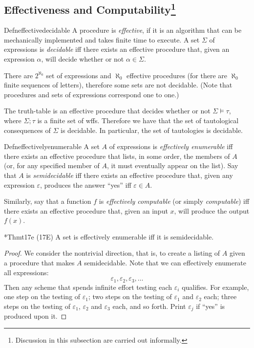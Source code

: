 \subsection*{Effectiveness and Computability\footnote{Discussion in this subsection are carried out informally.}}

\begin{reference}{Defn}{effectivedecidable}
  A procedure is \textit{effective}, if it is an algorithm that can be mechanically implemented and takes finite time to execute. A set $\Sigma$ of expressions is \textit{decidable} iff there exists an effective procedure that, given an expression $\alpha$, will decide whether or not $\alpha\in \Sigma$.
\end{reference}

There are $2^{\aleph_0}$ set of expressions and $\aleph_0$ effective procedures (for there are $\aleph_0$ finite sequences of letters), therefore some sets are not decidable. (Note that procedures and sets of expressions correspond one to one.)

The truth-table is an effective procedure that decides whether or not $\Sigma\vDash \tau$, where $\Sigma;\tau$ is a finite set of wffs. Therefore we have that the set of tautological consequences of $\Sigma$ is decidable. In particular, the set of tautologies is decidable.

\begin{reference}{Defn}{effectivelyenumerable}
  A set $A$ of expressions is \textit{effectively enumerable} iff there exists an effective procedure that lists, in some order, the members of $A$ (or, for any specified member of $A$, it must eventually appear on the list). Say that $A$ is \textit{semidecidable} iff there exists an effective procedure that, given any expression $\varepsilon$, produces the answer ``yes'' iff $\varepsilon\in A$.
\end{reference}

Similarly, say that a function $f$ is \textit{effectively computable} (or simply \textit{computable}) iff there exists an effective procedure that, given an input $x$, will produce the output $f(x)$.

\begin{reference}{*Thm}{t17e}
  (17E) A set is effectively enumerable iff it is semidecidable.
\end{reference}

\begin{proof}
  We consider the nontrivial direction, that is, to create a listing of $A$ given a procedure that makes $A$ semidecidable. Note that we can effectively enumerate all expressions:
  \[
    \varepsilon_1,\varepsilon_2,\varepsilon_3,\dots
  \]
  Then any scheme that spends infinite effort testing each $\varepsilon_i$ qualifies. For example, one step on the testing of $\varepsilon_1$; two steps on the testing of $\varepsilon_1$ and $\varepsilon_2$ each; three steps on the testing of $\varepsilon_1$, $\varepsilon_2$ and $\varepsilon_3$ each, and so forth. Print $\varepsilon_j$ if ``yes'' is produced upon it.
\end{proof}


